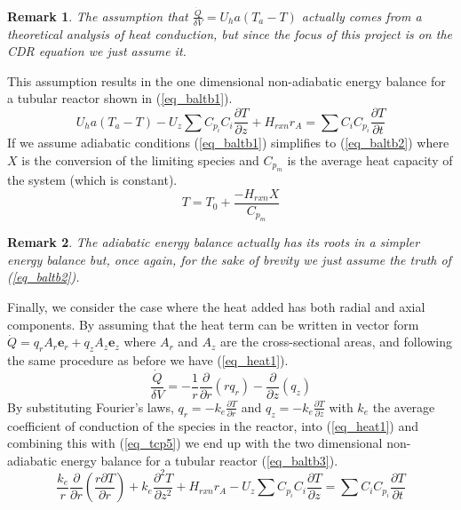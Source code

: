 \documentclass[11pt,fleqn]{article}
\theoremstyle{defstyle}
\newtheorem{rmrk}{Remark}[section]
\begin{document}
\begin{rmrk}
The assumption that $\frac{\dot{Q}}{\delta V} = U_ha(T_a-T)$ actually comes from a theoretical analysis of heat conduction, but since the focus of this project is on the CDR equation we just assume it. 
\end{rmrk} 
This assumption results in the one dimensional non-adiabatic energy balance for a tubular reactor shown in (\ref{eq_baltb1}).
\begin{equation}
U_ha(T_a-T) - U_z\sum C_{p_i}C_i \frac{\partial T}{\partial z} + H_{rxn}r_A = \sum C_i C_{p_i} \frac{\partial T}{\partial t}
\label{eq_baltb1}
\end{equation}
If we assume adiabatic conditions (\ref{eq_baltb1}) simplifies to (\ref{eq_baltb2}) where $X$ is the conversion of the limiting species and $C_{p_m}$ is the average heat capacity of the system (which is constant).
\begin{equation}
T = T_0 + \frac{-H_{rxn}X}{C_{p_m}}
\label{eq_baltb2}
\end{equation}
\begin{rmrk}
The adiabatic energy balance actually has its roots in a simpler energy balance but, once again, for the sake of brevity we just assume the truth of (\ref{eq_baltb2}).
\end{rmrk}
Finally, we consider the case where the heat added has both radial and axial components. By assuming that the heat term can be written in vector form $\dot{Q} = q_r A_r \mathbf{e}_r + q_z A_z \mathbf{e}_z$  where $A_r$ and $A_z$ are the cross-sectional areas, and following the same procedure as before we have (\ref{eq_heat1}).
\begin{equation}
\frac{\dot{Q}}{\delta V} = -\frac{1}{r}\frac{\partial}{\partial r}(r q_r) - \frac{\partial}{\partial z}(q_z)
\label{eq_heat1}
\end{equation}
By substituting Fourier's laws, $q_r = -k_e\frac{\partial T}{\partial r}$ and $q_z = -k_e\frac{\partial T}{\partial z}$ with $k_e$ the average coefficient of conduction of the species in the reactor, into (\ref{eq_heat1}) and combining this with (\ref{eq_tcp5}) we end up with the two dimensional non-adiabatic energy balance for a tubular reactor (\ref{eq_baltb3}).
\begin{equation}
\frac{k_e}{r}\frac{\partial}{\partial r}(\frac{r\partial T}{\partial r}) + k_e\frac{\partial ^2 T}{\partial z^2} + H_{rxn}r_A - U_z\sum C_{p_i}C_i \frac{\partial T}{\partial z} =\sum C_i C_{p_i} \frac{\partial T}{\partial t}
\label{eq_baltb3}
\end{equation}
\end{document}
